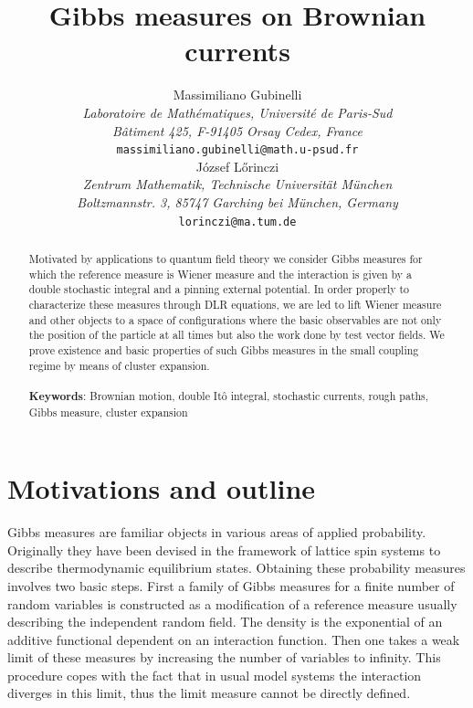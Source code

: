 \documentclass[a4paper,11pt]{article}
\begin{document}
\title
{\Large \bf Gibbs measures on Brownian currents}
\vspace{1.5cm}
\author{
\small Massimiliano Gubinelli\\[0.1cm]
 {\small\it    Laboratoire de Math\'ematiques,  
 Universit\'e de Paris-Sud }    \\[-0.7ex]
  {\small\it  B\^atiment 425,   F-91405 Orsay Cedex, France}      \\[-0.7ex]
 {\small  {\tt massimiliano.gubinelli@math.u-psud.fr}   }\\[0.5cm]
\small J\'ozsef L\H{o}rinczi\\[0.1cm]
{\it \small Zentrum Mathematik, Technische Universit\"at M\"unchen} \\[-0.7ex]
{\it \small Boltzmannstr. 3, 85747 Garching bei M\"unchen, Germany} \\[-0.7ex]
{\small {\tt  lorinczi@ma.tum.de}} \\[-0.7ex]}
\date{}
\maketitle
\vspace{2cm}
\begin{abstract}
\noindent
Motivated by applications to quantum field theory we consider Gibbs
measures for which the reference measure is Wiener measure and the
interaction is given by a double stochastic integral and a pinning 
external potential. In order properly to characterize these measures 
through DLR equations, we are led to lift Wiener measure and other 
objects to a space of configurations where the basic 
observables are not only the position of the particle at all times 
but also the work done by test vector fields. We prove existence and 
basic properties of such Gibbs measures in the small coupling regime 
by means of cluster expansion.
\\ \\
\textbf{Keywords}: Brownian motion, double It\^o integral, stochastic 
currents, rough paths, Gibbs measure, cluster expansion
\end{abstract}
\newpage
\section{Motivations and outline}
Gibbs measures are familiar objects in various areas of applied
probability. Originally they have been devised in the framework of 
lattice spin systems to describe thermodynamic equilibrium states. 
Obtaining these probability measures involves two basic steps. 
First a family of Gibbs measures for a finite number of random
variables is constructed as a modification of a reference measure 
usually describing the independent random field. The density is the
exponential of an additive functional dependent on an interaction 
function. Then one takes a weak limit of these measures by increasing 
the number of variables to infinity. This procedure copes with the
fact that in usual model systems the interaction diverges in this
limit, thus the limit measure cannot be directly defined. 
\end{document}
